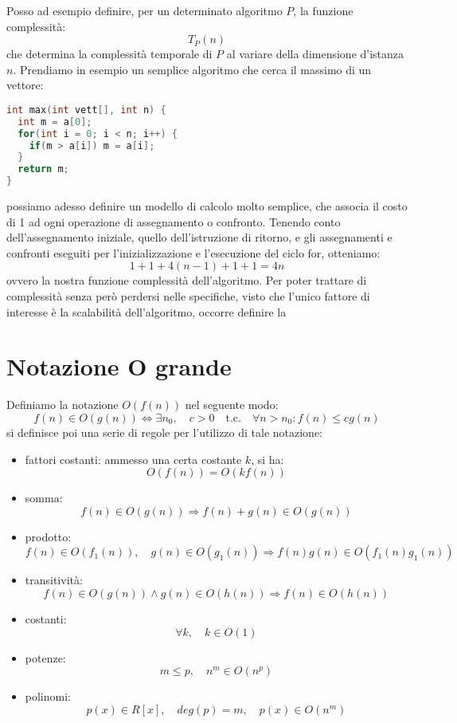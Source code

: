 \documentclass[a4paper,12pt]{article}
\begin{document}
Posso ad esempio definire, per un determinato algoritmo $P$, la funzione complessità:
$$ T_P(n) $$
che determina la complessità temporale di $P$ al variare della dimensione d'istanza $n$. Prendiamo in esempio
un semplice algoritmo che cerca il massimo di un vettore:

\begin{lstlisting}[language=C++]
int max(int vett[], int n) {
  int m = a[0];
  for(int i = 0; i < n; i++) {
    if(m > a[i]) m = a[i];
  }
  return m;
}
\end{lstlisting}

possiamo adesso definire un modello di calcolo molto semplice, che associa il costo di 1 ad ogni operazione
di assegnamento o confronto. Tenendo conto dell'assegnamento iniziale, quello dell'istruzione di ritorno, e gli 
assegnamenti e confronti eseguiti per l'inizializzazione e l'esecuzione del ciclo for, otteniamo:
$$ 1 + 1 + 4(n - 1) + 1 + 1 = 4n $$
ovvero la nostra funzione complessità dell'algoritmo. Per poter trattare di complessità senza però perdersi
nelle specifiche, visto che l'unico fattore di interesse è la scalabilità dell'algoritmo, occorre definire la

\section{Notazione O grande}
Definiamo la notazione $O(f(n))$ nel seguente modo:
$$ f(n) \in O(g(n)) \Leftrightarrow \exists n_0, \quad c > 0 \quad \mathrm{t.c.} \quad \forall n > n_0 : f(n) \leq cg(n) $$ 
si definisce poi una serie di regole per l'utilizzo di tale notazione:
\begin{itemize}
  \item fattori costanti:
    ammesso una certa costante $k$, si ha:
    $$ O(f(n)) = O(kf(n)) $$
  \item somma:
    $$ f(n) \in O(g(n)) \Rightarrow f(n) + g(n) \in O(g(n)) $$
  \item prodotto:
    $$f(n) \in O(f_1(n)), \quad g(n) \in O(g_1(n)) \Rightarrow f(n)g(n) \in O(f_1(n)g_1(n)) $$
  \item transitività:
    $$ f(n) \in O(g(n)) \land g(n) \in O(h(n)) \Rightarrow f(n) \in O(h(n)) $$
  \item costanti:
    $$ \forall k, \quad k \in O(1) $$
  \item potenze:
    $$ m \leq p, \quad n^m \in O(n^p) $$
  \item polinomi:
    $$ p(x) \in R[x], \quad deg(p) = m, \quad p(x) \in O(n^m) $$
\end{itemize}
\end{document}
